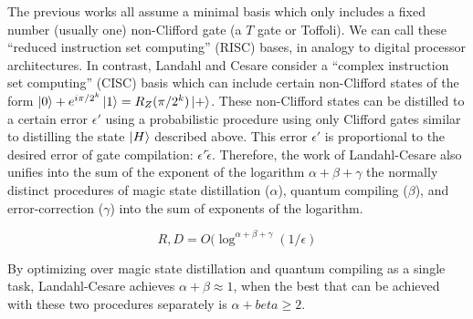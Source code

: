 The previous works all assume a minimal basis which only includes a fixed
number (usually one) non-Clifford gate (a $T$ gate or Toffoli). We can
call these ``reduced instruction set computing'' (RISC) bases, in analogy to
digital processor architectures.
In contrast, Landahl and
Cesare consider a ``complex instruction set computing'' (CISC) basis
\cite{Landahl2013b}
which
can include certain non-Clifford states of the form
$\left\vert{0}\right\rangle + e^{i\pi / 2^k} \left\vert{1}\right\rangle = R_Z(\pi/{2^k})\left\vert{+}\right\rangle$. These
non-Clifford states can be distilled to a certain error $\epsilon'$ using
a probabilistic procedure using only Clifford gates similar to distilling
the state $\left\vert{H}\right\rangle$ described above. This error $\epsilon'$ is proportional
to the desired error of gate compilation: $\epsilon' \tilde \epsilon$.
Therefore, the work of Landahl-Cesare also unifies into the sum of the 
exponent of the logarithm $\alpha + \beta + \gamma$ the
normally distinct procedures of
magic state distillation ($\alpha$),
quantum compiling ($\beta$),
and error-correction ($\gamma$) into
the sum of exponents of the logarithm.

\begin{equation}
R,D = O(\log ^{\alpha + \beta + \gamma} (1/\epsilon)
\end{equation}

By optimizing over magic state distillation and quantum compiling as a
single task, Landahl-Cesare achieves $\alpha + \beta \approx 1$, when the
best that can be achieved with these two procedures separately is
$\alpha + beta \ge 2$.


